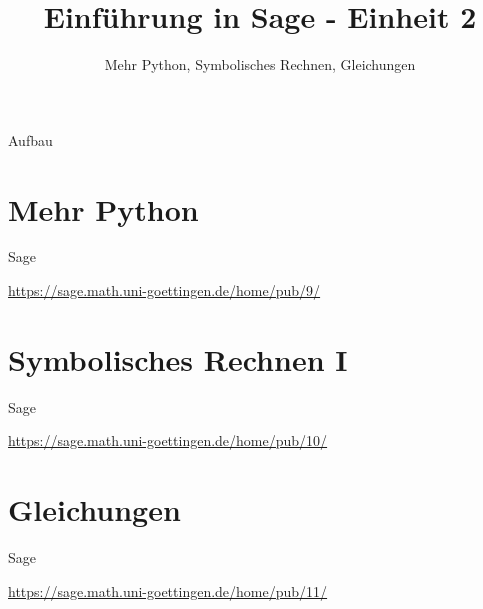 \documentclass[hyperref={xetex}]{beamer}
\title{Einführung in Sage - Einheit 2}
\subtitle{Mehr Python, Symbolisches Rechnen, Gleichungen}
\begin{document}
\titlepage

\begin{frame}{Aufbau}
\tableofcontents
\end{frame}

\section{Mehr Python}
\begin{frame}[fragile]{Sage}
\begin{center}
\url{https://sage.math.uni-goettingen.de/home/pub/9/}
\end{center}
\end{frame}

\section{Symbolisches Rechnen I}
\begin{frame}[fragile]{Sage}
\begin{center}
\url{https://sage.math.uni-goettingen.de/home/pub/10/}
\end{center}
\end{frame}
\section{Gleichungen}
\begin{frame}[fragile]{Sage}
\begin{center}
\url{https://sage.math.uni-goettingen.de/home/pub/11/}
\end{center}
\end{frame}
\end{document}
